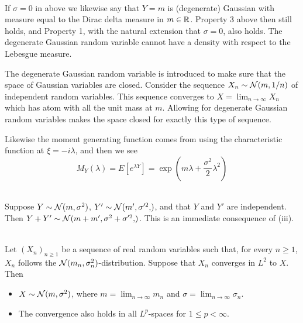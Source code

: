 \begin{remark} \label{chap1.1:remark-degenarate_gaussian_and_moment_generating_function_mgf}
 \\
If $\sigma=0$ in above we likewise say that $Y=m$ is (degenerate) Gaussian with measure equal to the Dirac delta measure in $m \in \mathbb{R}$. Property 3 above then still holds, and Property 1, with the natural extension that $\sigma=0$, also holds. The degenerate Gaussian random variable cannot have a density with respect to the Lebesgue measure.

The degenerate Gaussian random variable is introduced to make sure that the space of Gaussian variables are closed. Consider the sequence $X_n \sim \mathcal{N}(m,1/n)$ of independent random variables. This sequence converges to $X=\lim_{n\to\infty}X_n$ which has atom with all the unit mass at $m$. Allowing for degenerate Gaussian random variables makes the space closed for exactly this type of sequence.

Likewise the moment generating function comes from using the characteristic function at $\xi = -i\lambda$, and then we see
$$M_Y(\lambda)=E[e^{\lambda Y}]= \exp{\left(m\lambda +\frac{\sigma^2}{2}\lambda^2\right)}$$
\end{remark}

\begin{remark}\label{chap1.1:remark-sums_of_Gaussian_variables}
 \\
Suppose $Y \sim \mathcal{N}(m,\sigma^2)$, $Y' \sim \Norm{m',\sigma'^2}$, and that $Y$ and $Y'$ are independent. Then $Y+Y' \sim \Norm{m+m', \sigma^2+\sigma'^2}$. This is an immediate consequence of (iii).
\end{remark}


\begin{proposition} \label{chap1.1:proposition-sequence_of_Gaussian_variables}
 \\
Let $(X_n)_{n\geq1}$ be a sequence of real random variables such that, for every $n \geq 1$, $X_n$ follows the $\mathcal{N}(m_n,\sigma_n^2)$-distribution. Suppose that $X_n$ converges in $L^2$ to $X$. Then
\begin{itemize}[(i)]
    \item $X \sim \mathcal{N}(m,\sigma^2)$, where $m = \lim_{n\to\infty}m_n$ and $\sigma=\lim_{n\to\infty}\sigma_n$.
    \item The convergence also holds in all $L^p$-spaces for $1\leq p < \infty$.
\end{itemize}
\end{proposition}


